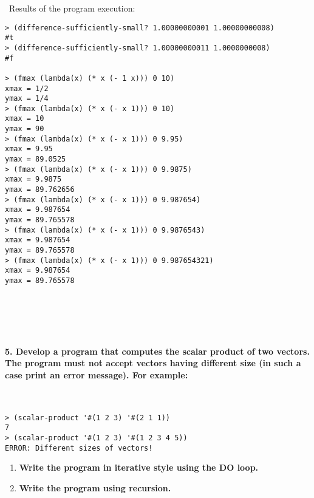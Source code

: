 \documentclass{article}
\begin{document}
\paragraph{}\
\paragraph{}\
\paragraph{}\
	Results of the program execution:
	
\begin{verbatim} 
> (difference-sufficiently-small? 1.00000000001 1.00000000008)
#t
> (difference-sufficiently-small? 1.00000000011 1.0000000008)
#f

> (fmax (lambda(x) (* x (- 1 x))) 0 10)
xmax = 1/2
ymax = 1/4
> (fmax (lambda(x) (* x (- x 1))) 0 10)
xmax = 10
ymax = 90
> (fmax (lambda(x) (* x (- x 1))) 0 9.95)
xmax = 9.95
ymax = 89.0525
> (fmax (lambda(x) (* x (- x 1))) 0 9.9875)
xmax = 9.9875
ymax = 89.762656
> (fmax (lambda(x) (* x (- x 1))) 0 9.987654)
xmax = 9.987654
ymax = 89.765578
> (fmax (lambda(x) (* x (- x 1))) 0 9.9876543)
xmax = 9.987654
ymax = 89.765578
> (fmax (lambda(x) (* x (- x 1))) 0 9.987654321)
xmax = 9.987654
ymax = 89.765578
\end{verbatim}

\paragraph{}\
\paragraph{}\

\paragraph{5. Develop a program that computes the scalar product of two vectors. The program must not accept vectors having different size (in such a case print an error message). For example: }\

\begin{verbatim} 
> (scalar-product '#(1 2 3) '#(2 1 1))
7
> (scalar-product '#(1 2 3) '#(1 2 3 4 5))
ERROR: Different sizes of vectors!
\end{verbatim}

\begin{enumerate}[label=(\alph*)]

	\item \textbf{Write the program in iterative style using the DO loop.}
	
	\item \textbf{Write the program using recursion.}
					
\end{enumerate}
\end{document}
